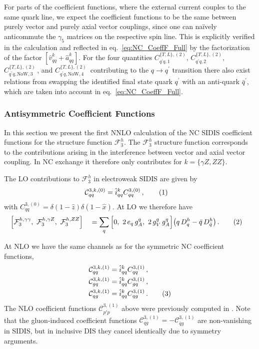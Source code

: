 \documentclass[11pt,a4paper]{article}
\newcommand{\Fcal}{\mathcal{F}}
\newcommand{\Ccal}{\mathcal{C}}
\newcommand{\qb}{\bar{q}}
\newcommand{\qp}{{q^\prime}}
\newcommand{\qbp}{{\bar{q}^\prime}}
\newcommand{\NC}{\mathrm{NC}}
\newcommand{\vh}{\hat{v}}
\newcommand{\ah}{\hat{a}}
\newcommand{\ih}{\hat{i}}
\newcommand{\xh}{\hat{x}}
\newcommand{\zh}{\hat{z}}
\newcommand\numberthis{\addtocounter{equation}{1}\tag{\theequation}}
\newcommand{\NoW}{\mathrm{NoW}}
\begin{document}
For parts of the coefficient functions, where the external current couples to the
same quark line, we expect the coefficient functions to be the same between
purely vector and purely axial vector couplings, since one can na\"ively anticommute
the $\gamma_5$ matrices on the respective spin line.
This is explicitly verified in the calculation and reflected in eq.~\eqref{eq:NC_CoeffF_Full} by the
factorization of the factor $\left[ \vh_{qq}^k + \ah_{qq}^k \right]$.
For the four quantities $C^{\{T,L\},(2)}_{\qp q, 1}$, $C^{\{T,L\},(2)}_{\qp q, 2}$, $C^{\{T,L\},(2)}_{\qp q, \NoW, 3}\,$, and $C^{\{T,L\},(2)}_{\qp q, \NoW, 4}\,$
contributing to the $q\to \qp$ transition there also exist relations from swapping the identified final state quark $\qp$ with an anti-quark $\qbp$,
which are taken into account in eq.~\eqref{eq:NC_CoeffF_Full}.


\subsubsection{Antisymmetric Coefficient Functions}

In this section we present the first NNLO calculation of the $\NC$ SIDIS coefficient functions for the structure function $\Fcal_3^h$.
The $\Fcal_3^h$ structure function corresponds to the contributions arising in the interference between vector and axial vector coupling.
In $\NC$ exchange it therefore only contributes for $k=\{\gamma Z, ZZ\}$.

The LO contributions to $\Fcal_3^h$ in electroweak SIDIS are given by
\begin{align*}
\Ccal^{3,k,(0)}_{qq} &= \ih_{qq}^k C^{3,(0)}_{qq} \,  ,  \numberthis
\end{align*}
with $C^{3,(0)}_{qq} = \delta(1-\zh)\delta(1-\xh)$.
At LO we therefore have
\begin{alignat*}{2}
& \Big[ \Fcal_{3}^{h,\gamma\gamma},~ \Fcal_{3}^{h,\gamma Z},~ \Fcal_{3}^{h,ZZ} \Big] &&= \sum_{q} \Big[ 0,~ 2 \, e_q \, g_A^q ,~ 2 \, g_V^q\, g_A^q \Big] \big( q \, D_q^h - \qb \, D_{\qb}^h \big) \, . \numberthis
\end{alignat*}

At NLO we have the same channels as for the symmetric NC coefficient functions,
\begin{align*}
\Ccal^{3,k,(1)}_{qq} &=  \ih_{qq}^k C^{3,(1)}_{qq} \,  , \\
\Ccal^{3,k,(1)}_{gq} &=  \ih_{qq}^k C^{3,(1)}_{gq} \,  , \\
\Ccal^{3,k,(1)}_{qg} &=  \ih_{qq}^k C^{3,(1)}_{qg} \,  .  \numberthis
\end{align*}
The NLO coefficient functions $\Ccal^{3,(1)}_{p'p}$ above were previously computed in \cite{Altarelli:1979kv}.
Note that the gluon-induced coefficient functions $\Ccal^{3,(1)}_{qg} = -\Ccal^{3,(1)}_{\bar{q}g}$ are non-vanishing in SIDIS, but in inclusive DIS they cancel identically due to symmetry arguments.
\end{document}
